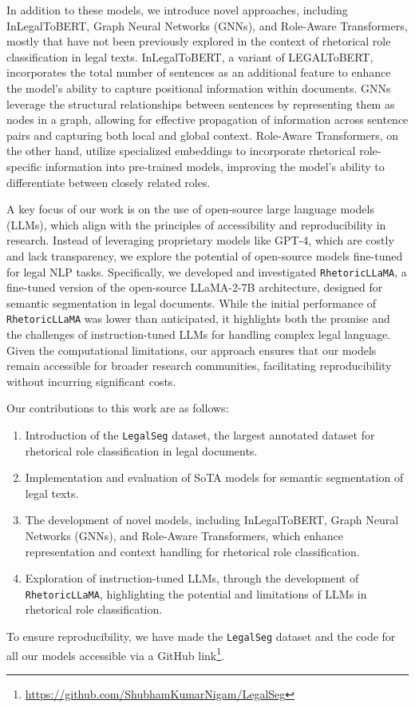 In addition to these models, we introduce novel approaches, including InLegalToBERT, Graph Neural Networks (GNNs), and Role-Aware Transformers, mostly that have not been previously explored in the context of rhetorical role classification in legal texts. InLegalToBERT, a variant of LEGALToBERT, incorporates the total number of sentences as an additional feature to enhance the model’s ability to capture positional information within documents. GNNs leverage the structural relationships between sentences by representing them as nodes in a graph, allowing for effective propagation of information across sentence pairs and capturing both local and global context. Role-Aware Transformers, on the other hand, utilize specialized embeddings to incorporate rhetorical role-specific information into pre-trained models, improving the model’s ability to differentiate between closely related roles.

A key focus of our work is on the use of open-source large language models (LLMs), which align with the principles of accessibility and reproducibility in research. Instead of leveraging proprietary models like GPT-4, which are costly and lack transparency, we explore the potential of open-source models fine-tuned for legal NLP tasks. Specifically, we developed and investigated \texttt{RhetoricLLaMA}, a fine-tuned version of the open-source LLaMA-2-7B architecture, designed for semantic segmentation in legal documents. While the initial performance of \texttt{RhetoricLLaMA} was lower than anticipated, it highlights both the promise and the challenges of instruction-tuned LLMs for handling complex legal language. Given the computational limitations, our approach ensures that our models remain accessible for broader research communities, facilitating reproducibility without incurring significant costs. 

Our contributions to this work are as follows:
\begin{enumerate}
    \item Introduction of the \texttt{LegalSeg} dataset, the largest annotated dataset for rhetorical role classification in legal documents.
    \item Implementation and evaluation of SoTA models for semantic segmentation of legal texts.
    \item The development of novel models, including InLegalToBERT, Graph Neural Networks (GNNs), and Role-Aware Transformers, which enhance representation and context handling for rhetorical role classification.
    \item Exploration of instruction-tuned LLMs, through the development of \texttt{RhetoricLLaMA}, highlighting the potential and limitations of LLMs in rhetorical role classification.
\end{enumerate}

To ensure reproducibility, we have made the \texttt{LegalSeg} dataset and the code for all our models accessible via a GitHub link\footnote{\href{https://github.com/ShubhamKumarNigam/LegalSeg}{https://github.com/ShubhamKumarNigam/LegalSeg}}. 
